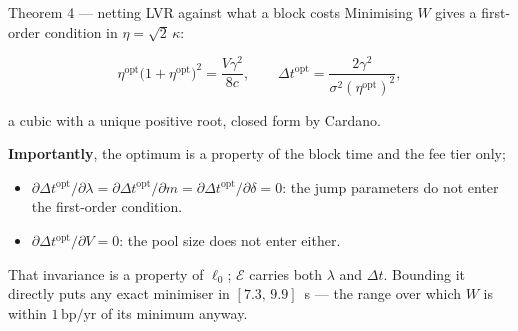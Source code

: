 \documentclass[10pt,xcolor=x11names,aspectratio=169]{beamer}
\newcommand{\dt}{\Delta t}
\newcommand{\1}{\mathbf{1}}
\newcommand{\bpyr}{\,\text{bp/yr}}
\begin{document}
\begin{frame}{Theorem 4 --- netting LVR against what a block costs}
  Minimising $W$ gives a first-order condition in $\eta = \sqrt2\,\kappa$:
  \begin{block}{}
    \[
      \eta^{\mathrm{opt}}\big(1+\eta^{\mathrm{opt}}\big)^2 = \frac{V\gamma^2}{8c},
      \qquad
      \dt^{\mathrm{opt}} = \frac{2\gamma^2}{\sigma^2(\eta^{\mathrm{opt}})^2},
    \]
  \end{block}
  a cubic with a unique positive root, closed form by Cardano.
  \medskip

  \textbf{Importantly}, the optimum is a property of the block time
and the fee tier only;
  \begin{itemize}
    \item $\partial\dt^{\mathrm{opt}}/\partial\lambda =
          \partial\dt^{\mathrm{opt}}/\partial m =
          \partial\dt^{\mathrm{opt}}/\partial\delta = 0$: the jump
          parameters do not enter the first-order condition.
    \item $\partial\dt^{\mathrm{opt}}/\partial V = 0$: the pool size does not enter either.
  \end{itemize}
  \begin{pitfall}
    That invariance is a property of $\ell_0$; $\mathcal E$ carries both
    $\lambda$ and $\dt$. Bounding it directly puts any exact minimiser in
    $[7.3,\,9.9]$~s --- the range over which $W$ is within $1\bpyr$ of its
    minimum anyway.
  \end{pitfall}
\end{frame}
\end{document}
